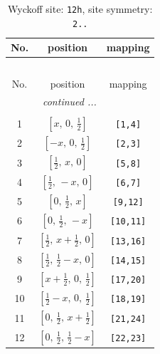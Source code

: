 \documentclass[fleqn,8pt]{jsarticle}
\begin{document}
\begin{longtable}{ccc}
\caption{Wyckoff site: {\tt 12h}, site symmetry: {\tt 2..}}
 \\
 \hline \hline
No. & position & mapping \\ \hline \endfirsthead

\multicolumn{2}{l}{\tablename\ \thetable{}} \\
 \hline \hline
No. & position & mapping \\ \hline \endhead

 \hline \hline
\multicolumn{2}{r}{\footnotesize\it continued ...} \\ \endfoot

 \hline \hline
\multicolumn{2}{r}{} \\ \endlastfoot

1 & $\left[ x,\, 0,\, \frac{1}{2} \right]$ & {\tt [1,4]} \\ \hline
2 & $\left[ - x,\, 0,\, \frac{1}{2} \right]$ & {\tt [2,3]} \\ \hline
3 & $\left[ \frac{1}{2},\, x,\, 0 \right]$ & {\tt [5,8]} \\ \hline
4 & $\left[ \frac{1}{2},\, - x,\, 0 \right]$ & {\tt [6,7]} \\ \hline
5 & $\left[ 0,\, \frac{1}{2},\, x \right]$ & {\tt [9,12]} \\ \hline
6 & $\left[ 0,\, \frac{1}{2},\, - x \right]$ & {\tt [10,11]} \\ \hline
7 & $\left[ \frac{1}{2},\, x + \frac{1}{2},\, 0 \right]$ & {\tt [13,16]} \\ \hline
8 & $\left[ \frac{1}{2},\, \frac{1}{2} - x,\, 0 \right]$ & {\tt [14,15]} \\ \hline
9 & $\left[ x + \frac{1}{2},\, 0,\, \frac{1}{2} \right]$ & {\tt [17,20]} \\ \hline
10 & $\left[ \frac{1}{2} - x,\, 0,\, \frac{1}{2} \right]$ & {\tt [18,19]} \\ \hline
11 & $\left[ 0,\, \frac{1}{2},\, x + \frac{1}{2} \right]$ & {\tt [21,24]} \\ \hline
12 & $\left[ 0,\, \frac{1}{2},\, \frac{1}{2} - x \right]$ & {\tt [22,23]} \\
\end{longtable}
\renewcommand{\arraystretch}{1.2}
\end{document}
